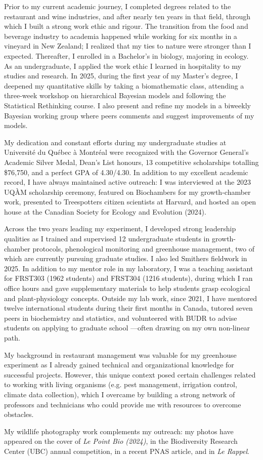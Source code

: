 \documentclass[12pt]{article}
\begin{document}
Prior to my current academic journey, I completed degrees related to the restaurant and wine industries, and after nearly ten years in that field, through which I built a strong work ethic and rigour. The transition from the food and beverage industry to academia happened while working for six months in a vineyard in New Zealand; I realized that my ties to nature were stronger than I expected. Thereafter, I enrolled in a Bachelor's in biology, majoring in ecology. As an undergraduate, I applied the work ethic I learned in hospitality to my studies and research. In 2025, during the first year of my Master's degree, I deepened my quantitative skills by taking a biomathematic class, attending a three-week workshop on hierarchical Bayesian models and following the Statistical Rethinking course. I also present and refine my models in a biweekly Bayesian working group where peers comments and suggest improvements of my models.

My dedication and constant efforts during my undergraduate studies at Université du Québec à Montréal were recognized with the Governor General's Academic Silver Medal, Dean's List honours, 13 competitive scholarships totalling \$76,750, and a perfect GPA of 4.30/4.30. In addition to my excellent academic record, I have always maintained active outreach: I was interviewed at the 2023 UQÀM scholarship ceremony, featured on Biochambers for my growth-chamber work, presented to Treespotters citizen scientists at Harvard, and hosted an open house at the Canadian Society for Ecology and Evolution (2024).

Across the two years leading my experiment, I developed strong leadership qualities as I trained and supervised 12 undergraduate students in growth-chamber protocols, phenological monitoring and greenhouse management, two of which are currently pursuing graduate studies. I also led Smithers fieldwork in 2025. In addition to my mentor role in my laboratory, I was a teaching assistant for FRST303 (1962 students) and FRST304 (1216 students), during which I ran office hours and gave supplementary materials to help students grasp ecological and plant-physiology concepts. Outside my lab work, since 2021, I have mentored twelve international students during their first months in Canada, tutored seven peers in biochemistry and statistics, and volunteered with BUDR to advise students on applying to graduate school ---often drawing on my own non-linear path.

My background in restaurant management was valuable for my greenhouse experiment as I already gained technical and organizational knowledge for successful projects. However, this unique context posed certain challenges related to working with living organisms (e.g. pest management, irrigation control, climate data collection), which I overcame by building a strong network of professors and technicians who could provide me with resources to overcome obstacles.


My wildlife photography work complements my outreach: my photos have appeared on the cover of \textit{Le Point Bio (2024)}, in the Biodiversity Research Center (UBC) annual competition, in a recent PNAS article, and in \textit{Le Rappel}.
\end{document}
